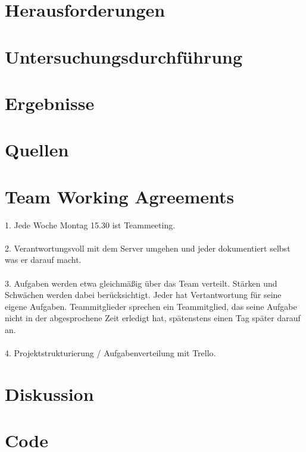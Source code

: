 \documentclass[12pt, 
	a4paper, 
	oneside, 
	leqno]{scrreprt}
\begin{document}


\chapter{Herausforderungen}

\chapter{Untersuchungsdurchführung}

\chapter{Ergebnisse}

\chapter{Quellen}

\chapter{Team Working Agreements}

1. Jede Woche Montag 15.30 ist Teammeeting.\\
\\
2. Verantwortungsvoll mit dem Server umgehen und jeder dokumentiert selbst was er darauf macht. \\
\\
3. Aufgaben werden etwa gleichmäßig über das Team verteilt. Stärken und Schwächen werden dabei berücksichtigt. Jeder hat Vertantwortung für seine eigene Aufgaben. Teammitglieder sprechen ein Teammitglied, das seine Aufgabe nicht in der abgesprochene Zeit erledigt hat, spätenstens einen Tag später darauf an.\\
\\
4. Projektstrukturierung / Aufgabenverteilung mit Trello. 

\chapter{Diskussion}

\chapter{Code}
\end{document}
